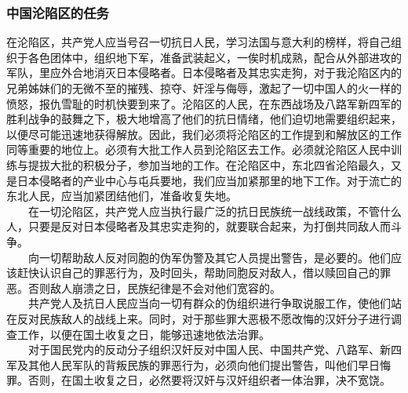 \documentclass[cn,11pt,chinese]{elegantbook}
\def\myformat#1{\hfil\hfil #1}
\begin{document}
\subsubsection*{\myformat{中国沦陷区的任务}}
在沦陷区，共产党人应当号召一切抗日人民，学习法国与意大利的榜样，将自己组织于各色团体中，组织地下军，准备武装起义，一俟时机成熟，配合从外部进攻的军队，里应外合地消灭日本侵略者。日本侵略者及其忠实走狗，对于我沦陷区内的兄弟姊妹们的无微不至的摧残、掠夺、奸淫与侮辱，激起了一切中国人的火一样的愤怒，报仇雪耻的时机快要到来了。沦陷区的人民，在东西战场及八路军新四军的胜利战争的鼓舞之下，极大地增高了他们的抗日情绪，他们迫切地需要组织起来，以便尽可能迅速地获得解放。因此，我们必须将沦陷区的工作提到和解放区的工作同等重要的地位上。必须有大批工作人员到沦陷区去工作。必须就沦陷区人民中训练与提拔大批的积极分子，参加当地的工作。在沦陷区中，东北四省沦陷最久，又是日本侵略者的产业中心与屯兵要地，我们应当加紧那里的地下工作。对于流亡的东北人民，应当加紧团结他们，准备收复失地。\\
　　在一切沦陷区，共产党人应当执行最广泛的抗日民族统一战线政策，不管什么人，只要是反对日本侵略者及其忠实走狗的，就要联合起来，为打倒共同敌人而斗争。\\
　　向一切帮助敌人反对同胞的伪军伪警及其它人员提出警告，是必要的。他们应该赶快认识自己的罪恶行为，及时回头，帮助同胞反对敌人，借以赎回自己的罪恶。否则敌人崩溃之日，民族纪律是不会对他们宽容的。\\
　　共产党人及抗日人民应当向一切有群众的伪组织进行争取说服工作，使他们站在反对民族敌人的战线上来。同时，对于那些罪大恶极不愿改悔的汉奸分子进行调查工作，以便在国土收复之日，能够迅速地依法治罪。\\
　　对于国民党内的反动分子组织汉奸反对中国人民、中国共产党、八路军、新四军及其他人民军队的背叛民族的罪恶行为，必须向他们提出警告，叫他们早日悔罪。否则，在国土收复之日，必然要将汉奸与汉奸组织者一体治罪，决不宽饶。\\
\end{document}
